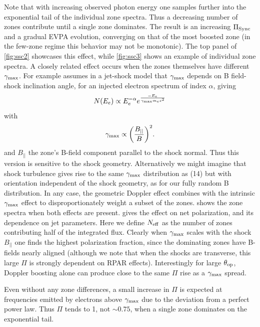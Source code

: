 Note that with increasing observed photon energy one samples further into the exponential tail of the individual zone spectra. Thus a decreasing number of zones contribute until a single zone dominates. The result is an increasing $\Pi_{\rm Sync}$ and a gradual EVPA evolution, converging on that of the most boosted zone (in the few-zone regime this behavior may not be monotonic). The top panel of \cref{fig:ssc2} showcases this effect, while \cref{fig:ssc3} shows an example of individual zone spectra. A closely related effect occurs when the zones themselves have different $\gamma_{\rm max}$. For example \citet{marscher_turbulent_2014} assumes in a jet-shock model that $\gamma_{\rm max}$ depends on B field-shock inclination angle, for an injected electron spectrum of index $\alpha$, giving
\begin{equation}
N(E_e) \propto E_e^{-\alpha}e^{\frac{-E_e}{\gamma_{\rm max}m_ec^2}}
\end{equation}
with
\begin{equation}
\gamma_{\rm max} \propto \bigg(\frac{B_{||}}{B} \bigg)^2 .
\end{equation}
and $B_{||}$ the zone's B-field component parallel to the shock normal. Thus this version is sensitive to the shock geometry. Alternatively we might imagine that shock turbulence gives rise to the same $\gamma_{\rm max}$ distribution as (14) but with orientation independent of the shock geometry, as for our fully random B distribution. In any case, the geometric Doppler effect combines with the intrinsic $\gamma_{\rm max}$ effect to disproportionately weight a subset of the zones.  shows the zone spectra when both effects are present.  gives the effect on net polarization, and its dependence  on jet parameters. Here we define $N_{\rm eff}$ as the number of zones contributing half of the integrated flux. Clearly when $\gamma_{\rm max}$ scales with the shock $B_{||}$ one finds the highest polarization fraction, since the dominating zones have B-fields nearly aligned (although we note that when the shocks are transverse, this large $\Pi$ is strongly dependent on RPAR effects). Interestingly for large $\theta_{\rm op}$, Doppler boosting alone can produce close to the same $\Pi$ rise as a $\gamma_{\rm max}$ spread.

Even without any zone differences, a small increase in $\Pi$ is expected at frequencies emitted by electrons above $\gamma_{\rm max}$ due to the deviation from a perfect power law. Thus $\Pi$ tends to 1, not $\sim 0.75$, when a single zone dominates on the exponential tail.


